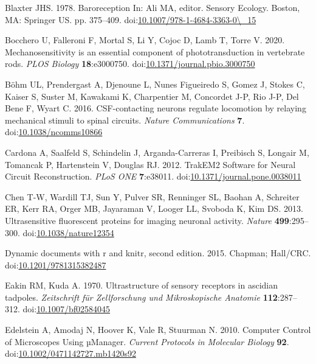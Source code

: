 \documentclass[
  11pt,
]{article}
\newlength{\cslhangindent}
\newenvironment{CSLReferences}[2] %
 {\begin{list}{}{%
  \setlength{\itemindent}{0pt}
  \setlength{\leftmargin}{0pt}
  \setlength{\parsep}{0pt}
  \ifodd #1
   \setlength{\leftmargin}{\cslhangindent}
   \setlength{\itemindent}{-1\cslhangindent}
  \fi
  \setlength{\itemsep}{#2\baselineskip}}}
 {\end{list}}
\begin{document}
\begin{CSLReferences}{1}{0}
Blaxter JHS. 1978. Baroreception In: Ali MA, editor. Sensory Ecology.
Boston, {MA}: Springer {US}. pp. 375--409.
doi:\href{https://doi.org/10.1007/978-1-4684-3363-0/_15}{10.1007/978-1-4684-3363-0\textbackslash\_15}

Bocchero U, Falleroni F, Mortal S, Li Y, Cojoc D, Lamb T, Torre V. 2020.
Mechanosensitivity is an essential component of phototransduction in
vertebrate rods. \emph{PLOS Biology} \textbf{18}:e3000750.
doi:\href{https://doi.org/10.1371/journal.pbio.3000750}{10.1371/journal.pbio.3000750}

Böhm UL, Prendergast A, Djenoune L, Nunes Figueiredo S, Gomez J, Stokes
C, Kaiser S, Suster M, Kawakami K, Charpentier M, Concordet J-P, Rio
J-P, Del Bene F, Wyart C. 2016. CSF-contacting neurons regulate
locomotion by relaying mechanical stimuli to spinal circuits.
\emph{Nature Communications} \textbf{7}.
doi:\href{https://doi.org/10.1038/ncomms10866}{10.1038/ncomms10866}

Cardona A, Saalfeld S, Schindelin J, Arganda-Carreras I, Preibisch S,
Longair M, Tomancak P, Hartenstein V, Douglas RJ. 2012. TrakEM2 Software
for Neural Circuit Reconstruction. \emph{PLoS ONE} \textbf{7}:e38011.
doi:\href{https://doi.org/10.1371/journal.pone.0038011}{10.1371/journal.pone.0038011}

Chen T-W, Wardill TJ, Sun Y, Pulver SR, Renninger SL, Baohan A,
Schreiter ER, Kerr RA, Orger MB, Jayaraman V, Looger LL, Svoboda K, Kim
DS. 2013. Ultrasensitive fluorescent proteins for imaging neuronal
activity. \emph{Nature} \textbf{499}:295--300.
doi:\href{https://doi.org/10.1038/nature12354}{10.1038/nature12354}

Dynamic documents with r and knitr, second edition. 2015. Chapman;
Hall/CRC.
doi:\href{https://doi.org/10.1201/9781315382487}{10.1201/9781315382487}

Eakin RM, Kuda A. 1970. Ultrastructure of sensory receptors in ascidian
tadpoles. \emph{Zeitschrift für Zellforschung und Mikroskopische
Anatomie} \textbf{112}:287--312.
doi:\href{https://doi.org/10.1007/bf02584045}{10.1007/bf02584045}

Edelstein A, Amodaj N, Hoover K, Vale R, Stuurman N. 2010. Computer
Control of Microscopes Using µManager. \emph{Current Protocols in
Molecular Biology} \textbf{92}.
doi:\href{https://doi.org/10.1002/0471142727.mb1420s92}{10.1002/0471142727.mb1420s92}


\end{CSLReferences}
\end{document}
